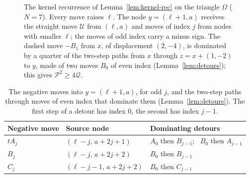\begin{figure}[t]
\centering
{}
\caption{The kernel recurrence of Lemma~\ref{lem:kernel-rec} on the triangle $\Omega$ ($N=7$). Every move raises $\ell$. The node $y=(\ell+1,a)$ receives the straight move $\mathcal U$ from $(\ell,a)$ and moves of index $j$ from nodes with smaller $\ell$; the moves of odd index carry a minus sign. The dashed move $-B_1$ from $x$, of displacement $(2,-4)$, is dominated by a quarter of the two-step paths from $x$ through $z=x+(1,-2)$ to $y$, made of two moves $B_0$ of even index (Lemma~\ref{lem:detours}); this gives $\mathcal P^2\geq4\mathcal Q$.}\label{fig:moves}
\end{figure}

\begin{table}[t]
\centering
\caption{The negative moves into $y=(\ell+1,a)$, for odd $j$, and the two-step paths through moves of even index that dominate them (Lemma~\ref{lem:detours}). The first step of a detour has index $0$, the second has index $j-1$.}\label{tab:detours}
\renewcommand{\arraystretch}{1.15}
\begin{tabular}{@{}lll@{}}
Negative move & Source node & Dominating detours\\\hline
$tA_j$ & $(\ell-j,\,a+2j+1)$ & $A_0$ then $B_{j-1}$; \ $B_0$ then $A_{j-1}$\\
$B_j$ & $(\ell-j,\,a+2j+2)$ & $B_0$ then $B_{j-1}$\\
$C_j$ & $(\ell-j-1,\,a+2j+2)$ & $B_0$ then $C_{j-1}$
\end{tabular}
\end{table}

